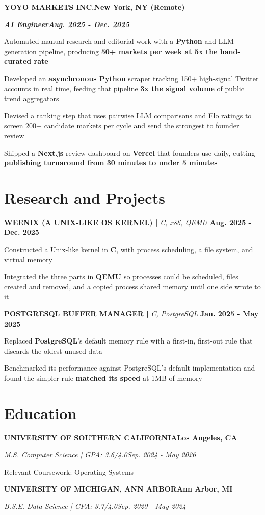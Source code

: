 \documentclass[10pt]{article}
\renewcommand{\note}[1]{#1\par}
\newcommand{\job}[4]{%
  \vspace{0pt}%
  \textbf{\MakeUppercase{#1}}\hfill\textbf{#2}\par
  \vspace{0.5pt}%
  \textbf{\textit{#3}}\hfill\textbf{\textit{#4}}\par
}
\newcommand{\school}[4]{%
  \vspace{2pt}%
  \textbf{\MakeUppercase{#1}}\hfill\textbf{#2}\par
  \vspace{0.5pt}%
  \textit{#3}\hfill\textit{#4}\par
}
\newcommand{\proj}[4]{%
  \vspace{3pt}%
  \textbf{\MakeUppercase{#1} | }\textit{#2}\hfill
  \textbf{#4}%
  \notblank{#3}{\ \textbf{| #3}}{}%
  \par
}
\begin{document}
\vspace{3pt}
\job{Yoyo Markets Inc.}{New York, NY (Remote)}{AI Engineer}{Aug. 2025 - Dec. 2025}
\begin{bullets}
  \item Automated manual research and editorial work with a \textbf{Python} and LLM generation pipeline, producing \textbf{50+ markets per week at 5x the hand-curated rate}
  \item Developed an \textbf{asynchronous Python} scraper tracking 150+ high-signal Twitter accounts in real time, feeding that pipeline \textbf{3x the signal volume} of public trend aggregators
  \item Devised a ranking step that uses pairwise LLM comparisons and Elo ratings to screen 200+ candidate markets per cycle and send the strongest to founder review
  \item Shipped a \textbf{Next.js} review dashboard on \textbf{Vercel} that founders use daily, cutting \textbf{publishing turnaround from 30 minutes to under 5 minutes}
\end{bullets}

\section{Research and Projects}
\vspace{-3pt}
\proj{Weenix (A Unix-Like OS Kernel)}{C, x86, QEMU}{USC}{Aug. 2025 - Dec. 2025}
\begin{bullets}
  \item Constructed a Unix-like kernel in \textbf{C}, with process scheduling, a file system, and virtual memory
  \item Integrated the three parts in \textbf{QEMU} so processes could be scheduled, files created and removed, and a copied process shared memory until one side wrote to it
\end{bullets}

\proj{PostgreSQL Buffer Manager}{C, PostgreSQL}{USC}{Jan. 2025 - May 2025}
\begin{bullets}
  \item Replaced \textbf{PostgreSQL}'s default memory rule with a first-in, first-out rule that discards the oldest unused data
  \item Benchmarked its performance against PostgreSQL's default implementation and found the simpler rule \textbf{matched its speed} at 1MB of memory
\end{bullets}

\section{Education}
\vspace{-2pt}
\school{University of Southern California}{Los Angeles, CA}{M.S. Computer Science | GPA: 3.6/4.0}{Sep. 2024 - May 2026}
\note{Relevant Coursework: Operating Systems}

\school{University of Michigan, Ann Arbor}{Ann Arbor, MI}{B.S.E. Data Science | GPA: 3.7/4.0}{Sep. 2020 - May 2024}
\end{document}
